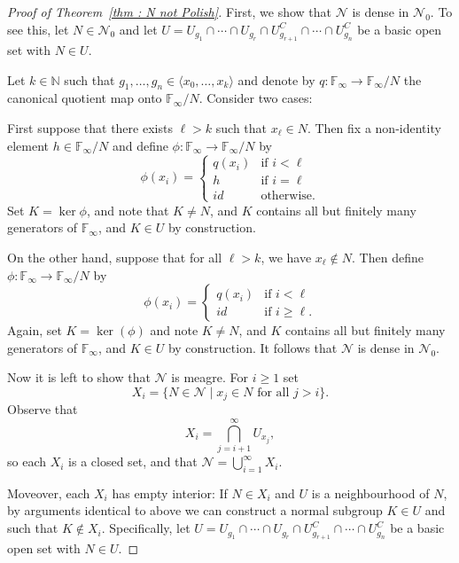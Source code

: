 \documentclass{amsart}
\theoremstyle{definition}
\theoremstyle{remark}
\begin{document}
\begin{proof}[Proof of Theorem~\ref{thm : N not Polish}]
First, we show that $\mathcal{N}$ is dense in $\mathcal{N}_0$.  To see this, let $N \in \mathcal{N}_0$ and let \(U= U_{g_1}\cap \dotsb \cap U_{g_r}\cap U^C_{g_{r+1}}\cap \dotsb\cap U^C_{g_n}\) be a basic open set with \(N \in U\).

    Let \(k\in \mathbb{N}\) such that \(g_1,\dotsc, g_n\in \langle x_0,\dotsc, x_k \rangle \) and denote by \(q\colon \mathbb{F}_\infty \to \mathbb{F}_\infty/N\) the canonical quotient map onto \(\mathbb{F}_\infty/N\). Consider two cases:
    
    First suppose that there exists \(\ell >k\) such that \(x_\ell \in N\). Then
    fix a non-identity element $h \in \mathbb{F}_{\infty}/N$ and define $\phi \colon \mathbb{F}_{\infty} \rightarrow \mathbb{F}_{\infty}/N$ by 
    \[
\phi(x_i) =
\begin{cases}
    q(x_i) &\text{if $i < \ell$}\\
    h &\text{if $i = \ell$} \\
    id & \text{otherwise.}
\end{cases}
\]
Set $K = \ker \phi$, and note that $K \neq N$, and $K$ contains all but finitely many generators of $\mathbb{F}_\infty$, and \(K \in U\) by construction.  

On the other hand, suppose that for all $\ell >k$, we have $x_\ell \notin N$.  Then define $\phi \colon \mathbb{F}_{\infty} \rightarrow \mathbb{F}_{\infty}/N$ by 
    \[
\phi(x_i) =
\begin{cases}
    q(x_i) &\text{if $i < \ell$}\\
    id &\text{if $i \geq \ell$}. 
\end{cases}
\]
Again, set $K = \ker(\phi)$ and note $K \neq N$, and $K$ contains all but finitely many generators of $\mathbb{F}_\infty$, and \(K \in U\) by construction.  It follows that $\mathcal{N}$ is dense in $\mathcal{N}_0$.

Now it is left to show that \(\mathcal{N}\) is meagre. For $i \geq 1$ set 
$$
X_i = \{ N \in \mathcal{N} \mid x_j \in N \text{ for all } j>i \}.
$$
Observe that 
\[ X_i = \bigcap_{j=i+1}^\infty U_{x_j},
\]
so each $X_i$ is a closed set, and that $\mathcal{N} = \bigcup_{i=1}^\infty X_i$.  

Moveover, each $X_i$ has empty interior:  If $N \in X_i$ and $U$ is a neighbourhood of $N$, by arguments identical to above we can construct a normal subgroup $K \in U$ and such that $K \notin X_i$.  Specifically,  let \(U= U_{g_1}\cap \dotsb \cap U_{g_r}\cap U^C_{g_{r+1}}\cap \dotsb\cap U^C_{g_n}\) be a basic open set with \(N \in U\).


\end{proof}
\end{document}
